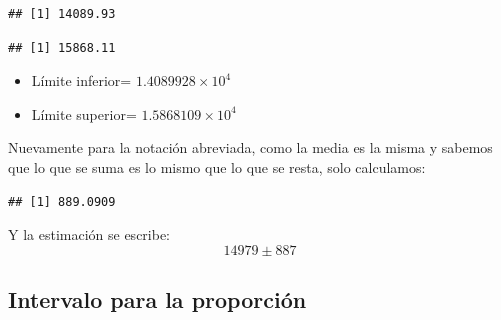 \documentclass[]{book}
\newenvironment{Shaded}{\begin{snugshade}}{\end{snugshade}}
\newcommand{\DecValTok}[1]{\textcolor[rgb]{0.00,0.00,0.81}{#1}}
\newcommand{\KeywordTok}[1]{\textcolor[rgb]{0.13,0.29,0.53}{\textbf{#1}}}
\newcommand{\NormalTok}[1]{#1}
\newcommand{\OperatorTok}[1]{\textcolor[rgb]{0.81,0.36,0.00}{\textbf{#1}}}
\newcommand{\StringTok}[1]{\textcolor[rgb]{0.31,0.60,0.02}{#1}}
\providecommand{\tightlist}{%
  \setlength{\itemsep}{0pt}\setlength{\parskip}{0pt}}
\begin{document}
\begin{verbatim}
## [1] 14089.93
\end{verbatim}

\begin{Shaded}
\end{Shaded}

\begin{verbatim}
## [1] 15868.11
\end{verbatim}

\begin{itemize}
\tightlist
\item
  Límite inferior= \ensuremath{1.4089928\times 10^{4}}
\item
  Límite superior= \ensuremath{1.5868109\times 10^{4}}
\end{itemize}

Nuevamente para la notación abreviada, como la media es la misma y sabemos que lo que se suma es lo mismo que lo que se resta, solo calculamos:

\begin{Shaded}
\end{Shaded}

\begin{verbatim}
## [1] 889.0909
\end{verbatim}

Y la estimación se escribe:\[14979 \pm 887\]

\hypertarget{intervalo-para-la-proporciuxf3n}{%
\subsection{Intervalo para la proporción}\label{intervalo-para-la-proporciuxf3n}}
\end{document}
